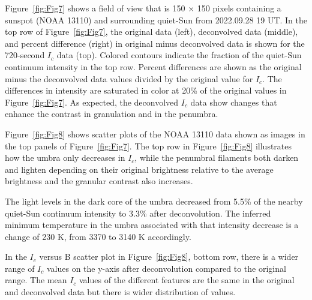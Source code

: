 \documentclass[trackchanges]{aastex62}
\begin{document}
Figure~\ref{fig:Fig7} shows a field of view that is 150 $\times$ 150 pixels  containing a sunspot (NOAA 13110) and surrounding quiet-Sun from 2022.09.28 19 UT. In the top row of Figure~\ref{fig:Fig7}, the original data (left), deconvolved data (middle), and percent difference (right) in original minus deconvolved data is shown for the 720-second $I_c$  data (top). Colored contours indicate the fraction of the quiet-Sun continuum intensity in the top row. Percent differences are shown as the original minus the deconvolved data values divided by the
original value for $I_c$. The differences in intensity are saturated in color at 20\% of the original values in Figure~\ref{fig:Fig7}. As expected, the deconvolved $I_c$ data show changes that enhance the contrast in granulation and in the penumbra. 

Figure~\ref{fig:Fig8} shows scatter plots of the NOAA 13110 data shown as images in the top panels of Figure~\ref{fig:Fig7}. The top row in Figure~\ref{fig:Fig8} illustrates how the umbra only decreases in $I_c$, while the penumbral filaments both darken and lighten depending on their original brightness relative to the average brightness and the granular contrast also increases. 

The light levels in the dark core of the umbra decreased from 5.5\% of the nearby quiet-Sun continuum intensity to 3.3\% after deconvolution. The inferred minimum temperature in the umbra associated with that intensity decrease is a change of 230 K, from 3370 to 3140 K accordingly. 

In the $I_c$ versus B scatter plot in Figure~\ref{fig:Fig8}, bottom row, there is a wider range of $I_c$ values on the y-axis after deconvolution compared to the original range.  The mean $I_c$ values of the different features are the same in the original and deconvolved data but there is wider distribution of values. 
\end{document}
